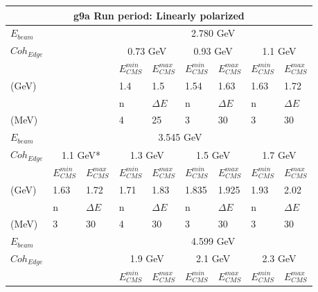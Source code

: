 \begin{table}
  \begin{center}
    \begin{tabular}{ |l||l|l||l|l||l|l||l|l||}
      \hline
      \multicolumn{9}{|c|}{g9a Run period: Linearly polarized } \\
      \hline
      \multicolumn{3}{|l||}{$E_{beam}$} & \multicolumn{6}{|c||}{2.780 GeV}   \\
      \hline
      \multicolumn{3}{|l||}{$Coh_{Edge}$} & \multicolumn{2}{|c||}{0.73 GeV} &  \multicolumn{2}{|c||}{0.93 GeV} &  \multicolumn{2}{|c||}{1.1 GeV}   \\
      \hline
      \multicolumn{3}{|l||}{} & $E_{CMS}^{min} $ &  $E_{CMS}^{max} $ & $E_{CMS}^{min} $ &  $E_{CMS}^{max} $ & $E_{CMS}^{min} $ &  $E_{CMS}^{max} $\\
      \multicolumn{3}{|l||}{(GeV)} & 1.4 & 1.5 & 1.54 & 1.63 & 1.63 & 1.72  \\
      \hline
      \multicolumn{3}{|l||}{} & n  &  $\Delta E$ & n  &  $\Delta E$ & n  &  $\Delta E$ \\
      \multicolumn{3}{|l||}{(MeV)} & 4 & 25 & 3 & 30 & 3 & 30  \\
      \hline
      \hline
      $E_{beam}$&  \multicolumn{8}{|c||}{3.545 GeV} \\
      \hline
      $Coh_{Edge}$&  \multicolumn{2}{|c||}{1.1 GeV*} &  \multicolumn{2}{|c||}{1.3 GeV} &  \multicolumn{2}{|c||}{1.5 GeV} &  \multicolumn{2}{|c||}{1.7 GeV} \\
      \hline
      & $E_{CMS}^{min} $ &  $E_{CMS}^{max} $& $E_{CMS}^{min} $ &  $E_{CMS}^{max} $ & $E_{CMS}^{min} $ &  $E_{CMS}^{max} $ & $E_{CMS}^{min} $ &  $E_{CMS}^{max} $ \\
      (GeV) & 1.63 & 1.72 & 1.71 & 1.83 & 1.835 & 1.925 &  1.93 & 2.02 \\
      \hline
      & n  &  $\Delta E$ & n  &  $\Delta E$ & n  &  $\Delta E$& n  &  $\Delta E$ \\
      (MeV) & 3 & 30 & 4 & 30 & 3 & 30 &3 &30 \\
      \hline
      \hline
      \multicolumn{3}{|l||}{$E_{beam}$} &  \multicolumn{6}{|c||}{4.599 GeV} \\
      \hline
      \multicolumn{3}{|l||}{$Coh_{Edge}$} &  \multicolumn{2}{|c||}{1.9 GeV} &  \multicolumn{2}{|c||}{2.1 GeV} &  \multicolumn{2}{|c||}{2.3 GeV}  \\
      \hline
      \multicolumn{3}{|l||}{} & $E_{CMS}^{min} $ &  $E_{CMS}^{max} $& $E_{CMS}^{min} $ &  $E_{CMS}^{max} $ & $E_{CMS}^{min} $ &  $E_{CMS}^{max} $ \\

\end{tabular}
\end{center}
\end{table}
